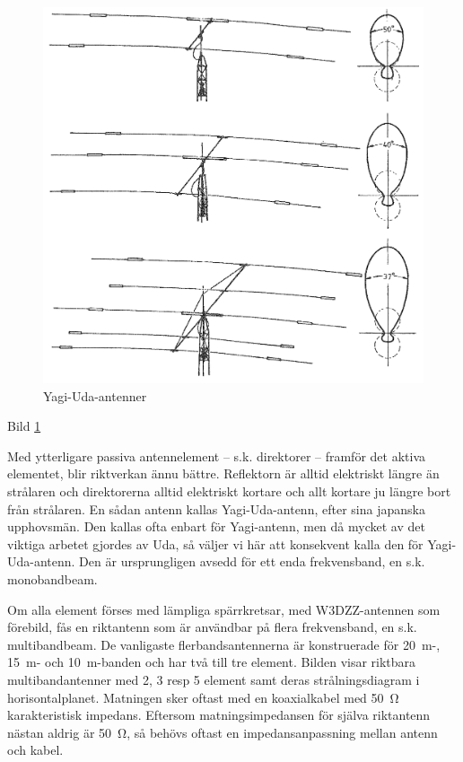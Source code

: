 \begin{figure}
  \includegraphics[width=\textwidth]{images/bild_2_6-18.png}
  \caption{Yagi-Uda-antenner}
  \label{fig:bildII6-18}
\end{figure}

Bild \ref{fig:bildII6-18}

Med ytterligare passiva antennelement -- s.k. direktorer -- framför det
aktiva elementet, blir riktverkan ännu bättre. Reflektorn är alltid
elektriskt längre än strålaren och direktorerna alltid elektriskt
kortare och allt kortare ju längre bort från strålaren.
En sådan antenn kallas Yagi-Uda-antenn, efter sina japanska upphovsmän.
Den kallas ofta enbart för Yagi-antenn, men då mycket av det viktiga arbetet
gjordes av Uda, så väljer vi här att konsekvent kalla den för Yagi-Uda-antenn.
Den är ursprungligen avsedd för ett enda frekvensband, en s.k. monobandbeam.

Om alla element förses med lämpliga spärrkretsar, med W3DZZ-antennen
som förebild, fås en riktantenn som är användbar på flera
frekvensband, en s.k. multibandbeam. De vanligaste flerbandsantennerna
är konstruerade för 20~m-, 15~m- och 10~m-banden och har två till tre
element.  Bilden visar riktbara multibandantenner med 2, 3 resp 5
element samt deras strålningsdiagram i horisontalplanet.  Matningen
sker oftast med en koaxialkabel med 50~Ω karakteristisk
impedans. Eftersom matningsimpedansen för själva riktantenn nästan
aldrig är 50~Ω, så behövs oftast en impedansanpassning mellan antenn
och kabel.

